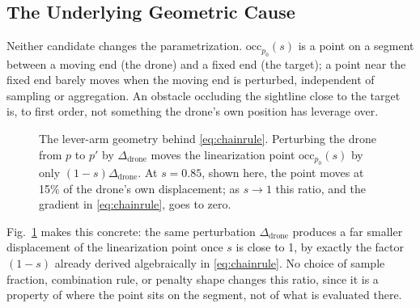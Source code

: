 \documentclass[conference]{IEEEtran}
\begin{document}
\subsection{The Underlying Geometric Cause}

Neither candidate changes the parametrization. $\text{occ}_{p_0}(s)$ is a point on a segment between a moving end (the drone) and a fixed end (the target); a point near the fixed end barely moves when the moving end is perturbed, independent of sampling or aggregation. An obstacle occluding the sightline close to the target is, to first order, not something the drone's own position has leverage over.

\begin{figure}[t]
\centering
{}
\caption{The lever-arm geometry behind \eqref{eq:chainrule}. Perturbing the drone from $p$ to $p'$ by $\Delta_{\text{drone}}$ moves the linearization point $\text{occ}_{p_0}(s)$ by only $(1-s)\Delta_{\text{drone}}$. At $s=0.85$, shown here, the point moves at 15\% of the drone's own displacement; as $s\to1$ this ratio, and the gradient in \eqref{eq:chainrule}, goes to zero.}
\label{fig:leverarm}
\end{figure}

Fig.~\ref{fig:leverarm} makes this concrete: the same perturbation $\Delta_{\text{drone}}$ produces a far smaller displacement of the linearization point once $s$ is close to 1, by exactly the factor $(1-s)$ already derived algebraically in \eqref{eq:chainrule}. No choice of sample fraction, combination rule, or penalty shape changes this ratio, since it is a property of where the point sits on the segment, not of what is evaluated there.
\end{document}
